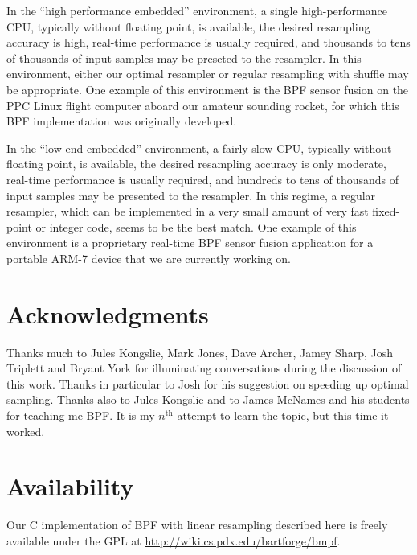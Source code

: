\documentclass[12pt]{article}
\begin{document}
  In the ``high performance embedded'' environment, a single
  high-performance CPU, typically without floating point, is
  available, the desired resampling accuracy is high,
  real-time performance is usually required, and thousands
  to tens of thousands of input samples may be preseted to
  the resampler.  In this environment, either our optimal
  resampler or regular resampling with shuffle may be
  appropriate.  One example of this environment is the BPF
  sensor fusion on the PPC Linux flight computer aboard our
  amateur sounding rocket, for which this BPF implementation
  was originally developed.

  In the ``low-end embedded'' environment, a fairly slow
  CPU, typically without floating point, is available, the
  desired resampling accuracy is only moderate, real-time
  performance is usually required, and hundreds to tens of
  thousands of input samples may be presented to the
  resampler.  In this regime, a regular resampler, which
  can be implemented in a very small amount of very fast
  fixed-point or integer code, seems to be the best match.
  One example of this environment is a proprietary real-time
  BPF sensor fusion application for a portable ARM-7 device
  that we are currently working on.

\section*{Acknowledgments}

  Thanks much to Jules Kongslie, Mark Jones, Dave Archer,
  Jamey Sharp, Josh Triplett and Bryant York for
  illuminating conversations during the discussion of this
  work.  Thanks in particular to Josh for his suggestion on
  speeding up optimal sampling.  Thanks also to Jules
  Kongslie and to James McNames and his students for
  teaching me BPF.  It is my $n^{\text{th}}$ attempt to
  learn the topic, but this time it worked.

\section*{Availability}

  Our C implementation of BPF with linear resampling
  described here is freely available under the GPL at
  \url{http://wiki.cs.pdx.edu/bartforge/bmpf}.



\end{document}
